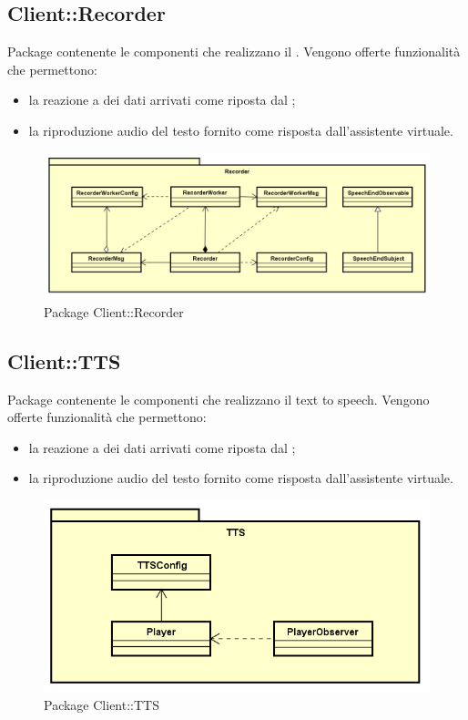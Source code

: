 \subsection{Client::Recorder}
Package contenente le componenti che realizzano il . Vengono offerte funzionalità che permettono: \begin{itemize} \item la reazione a dei dati arrivati come riposta dal ; \item la riproduzione audio del testo fornito come risposta dall'assistente virtuale. \end{itemize}
\begin{figure}[h] \centering \includegraphics[width=\textwidth,height=\textheight,keepaspectratio]{images/diagrams/client/Client/Recorder.png}
	\caption{Package Client::Recorder}
\end{figure}
\newpage


\subsection{Client::TTS}
Package contenente le componenti che realizzano il text to speech. Vengono offerte funzionalità che permettono: \begin{itemize} \item la reazione a dei dati arrivati come riposta dal ; \item la riproduzione audio del testo fornito come risposta dall'assistente virtuale. \end{itemize}
\begin{figure}[h] \centering \includegraphics[width=\textwidth,height=\textheight,keepaspectratio]{images/diagrams/client/Client/TTS.png}
	\caption{Package Client::TTS}
\end{figure}
\newpage


